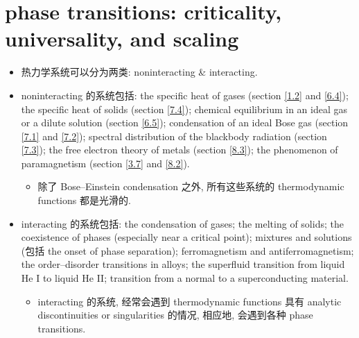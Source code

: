 \chapter{phase transitions: criticality, universality, and scaling}
\begin{itemize}
	\item 热力学系统可以分为两类: noninteracting \& interacting.
	
	\item noninteracting 的系统包括: the specific heat of gases (section \ref{1.2} and \ref{6.4}); the specific heat of solids (section \ref{7.4}); chemical equilibrium in an ideal gas or a dilute solution (section \ref{6.5}); condensation of an ideal Bose gas (section \ref{7.1} and \ref{7.2}); spectral distribution of the blackbody radiation (section \ref{7.3}); the free electron theory of metals (section \ref{8.3}); the phenomenon of paramagnetism (section \ref{3.7} and \ref{8.2}).
	\begin{itemize}
		\item 除了 Bose--Einstein condensation 之外, 所有这些系统的 thermodynamic functions 都是光滑的.
	\end{itemize}
	
	\item interacting 的系统包括: the condensation of gases; the melting of solids; the coexistence of phases (especially near a critical point); mixtures and solutions (包括 the onset of phase separation); ferromagnetism and antiferromagnetism; the order--disorder transitions in alloys; the superfluid transition from liquid He I to liquid He II; transition from a normal to a superconducting material.
	\begin{itemize}
		\item interacting 的系统, 经常会遇到 thermodynamic functions 具有 analytic discontinuities or singularities 的情况, 相应地, 会遇到各种 phase transitions.
	\end{itemize}
\end{itemize}

